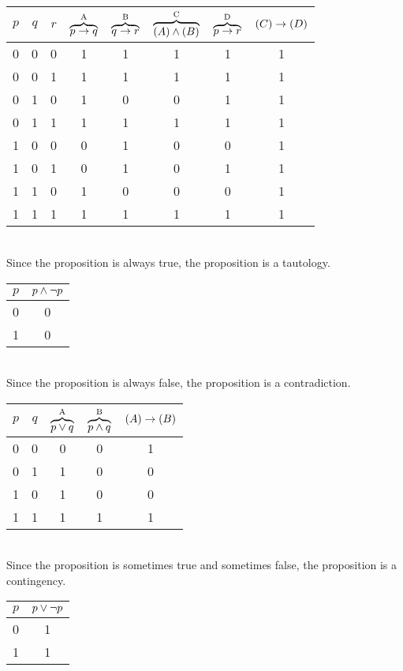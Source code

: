 \begin{solutions}
\spart
\begin{tabular}{ccc | ccccc}
	\toprule
	$p$& $q$& $r$ &
	$\overbrace{p\rightarrow q}^\text{A}$ & 
	$\overbrace{q \rightarrow r}^\text{B}$ &
	$\overbrace{(A)\wedge (B)}^\text{C}$ &
	$\overbrace{p \rightarrow r}^\text{D}$ &
	$(C) \rightarrow (D)$
	\\
	\midrule
	\strut 
	0& 0&  0& 1& 1 & 1 & 1 & 1\\
	0& 0&  1& 1& 1 & 1 & 1 & 1\\
 	0& 1&  0& 1& 0 & 0 & 1 & 1\\
	0& 1&  1& 1& 1 & 1 & 1 & 1\\
	1& 0&  0& 0& 1 & 0 & 0 & 1\\
	1& 0&  1& 0& 1 & 0 & 1 & 1\\
	1& 1&  0& 1& 0 & 0 & 0 & 1\\
	1& 1&  1& 1& 1 & 1 & 1 & 1\\
	\bottomrule
\end{tabular}

\hfill\\
Since the proposition is always true, the proposition is a tautology. 

\spart
\begin{tabular}{c | c}
	\toprule
	$p$& 
	$p\wedge \lnot p$ \\
	\midrule
	\strut 
	0&0\\
	1&0\\
	\bottomrule
\end{tabular}

\hfill\\
Since the proposition is always false, the proposition is a contradiction.
\spart
\begin{tabular}{cc | ccc}
	\toprule
	$p$& $q$& 
	$\overbrace{p\vee q}^\text{A}$ &
	$\overbrace{p\wedge q}^\text{B}$ &
	$(A)\rightarrow (B)$\\
	\midrule
	\strut 
	0& 0&  0& 0& 1\\
	0& 1&  1& 0& 0\\
	1& 0&  1& 0& 0\\
	1& 1&  1& 1& 1\\
	\bottomrule
\end{tabular}

\hfill\\
Since the proposition is sometimes true and sometimes false, the proposition is a contingency. 
\spart
\begin{tabular}{c | c}
	\toprule
	$p$& 
	$p\vee \lnot p$ \\
	\midrule
	\strut 
	0&1\\
	1&1\\
	\bottomrule
\end{tabular}


\end{solutions}
